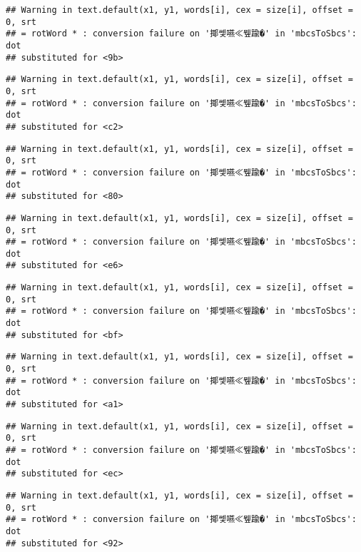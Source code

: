 \documentclass[]{article}
\begin{document}
\begin{verbatim}
## Warning in text.default(x1, y1, words[i], cex = size[i], offset = 0, srt
## = rotWord * : conversion failure on '揶쎛嚥≪뮆踰�' in 'mbcsToSbcs': dot
## substituted for <9b>
\end{verbatim}

\begin{verbatim}
## Warning in text.default(x1, y1, words[i], cex = size[i], offset = 0, srt
## = rotWord * : conversion failure on '揶쎛嚥≪뮆踰�' in 'mbcsToSbcs': dot
## substituted for <c2>
\end{verbatim}

\begin{verbatim}
## Warning in text.default(x1, y1, words[i], cex = size[i], offset = 0, srt
## = rotWord * : conversion failure on '揶쎛嚥≪뮆踰�' in 'mbcsToSbcs': dot
## substituted for <80>
\end{verbatim}

\begin{verbatim}
## Warning in text.default(x1, y1, words[i], cex = size[i], offset = 0, srt
## = rotWord * : conversion failure on '揶쎛嚥≪뮆踰�' in 'mbcsToSbcs': dot
## substituted for <e6>
\end{verbatim}

\begin{verbatim}
## Warning in text.default(x1, y1, words[i], cex = size[i], offset = 0, srt
## = rotWord * : conversion failure on '揶쎛嚥≪뮆踰�' in 'mbcsToSbcs': dot
## substituted for <bf>
\end{verbatim}

\begin{verbatim}
## Warning in text.default(x1, y1, words[i], cex = size[i], offset = 0, srt
## = rotWord * : conversion failure on '揶쎛嚥≪뮆踰�' in 'mbcsToSbcs': dot
## substituted for <a1>
\end{verbatim}

\begin{verbatim}
## Warning in text.default(x1, y1, words[i], cex = size[i], offset = 0, srt
## = rotWord * : conversion failure on '揶쎛嚥≪뮆踰�' in 'mbcsToSbcs': dot
## substituted for <ec>
\end{verbatim}

\begin{verbatim}
## Warning in text.default(x1, y1, words[i], cex = size[i], offset = 0, srt
## = rotWord * : conversion failure on '揶쎛嚥≪뮆踰�' in 'mbcsToSbcs': dot
## substituted for <92>
\end{verbatim}
\end{document}
